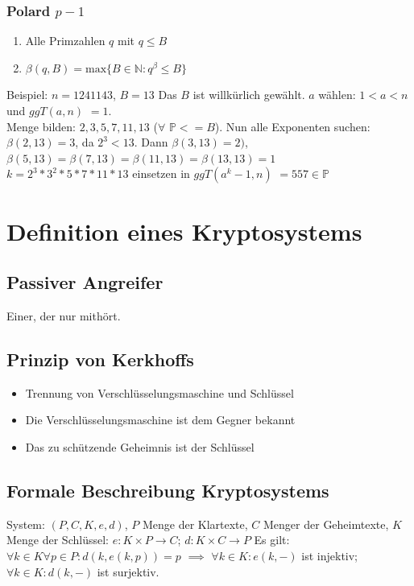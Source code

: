 \documentclass[10pt]{article}
\newcommand{\PN}{\mathbb{P}} %
\begin{document}
\subsubsection{Polard $p -1$}
\begin{enumerate}
\item Alle Primzahlen $q$ mit $q \le B$
\item $\beta(q, B) = \text{max}\{B \in \mathbb{N}: q^\beta \le B\}$
\end{enumerate}
Beispiel:
$n=1241143$, $B=13$ Das $B$ ist willkürlich gewählt. $a$ wählen: $ 1 < a < n$ und $ggT(a, n)$ $= 1$. \\
Menge bilden: ${2, 3, 5, 7, 11, 13}$ ($\forall$ $\PN<=B$). Nun alle Exponenten suchen: $\beta (2, 13) = 3$, da $2^3 < 13$. Dann $\beta (3, 13) = 2)$, 
$\beta (5, 13) = \beta (7, 13) = \beta (11, 13) = \beta (13, 13) = 1$ \\
$k = 2^3 * 3^2 * 5 * 7 * 11 * 13$ einsetzen in $ggT(a^k-1, n)$ $= 557 \in \PN$

\newpage
\section{Definition eines Kryptosystems}
\subsection{Passiver Angreifer}
Einer, der nur mithört.
\subsection{Prinzip von Kerkhoffs}
\begin{itemize}
	\item Trennung von Verschlüsselungsmaschine und Schlüssel
	\item Die Verschlüsselungsmaschine ist dem Gegner bekannt
	\item Das zu schützende Geheimnis ist der Schlüssel
\end{itemize}
\subsection{Formale Beschreibung Kryptosystems}
System: $(P, C, K, e, d)$, $P$ Menge der Klartexte, $C$ Menger der Geheimtexte, $K$ Menge der Schlüssel:
$e: K \times P \rightarrow C$; $d: K \times C \rightarrow P$
Es gilt: $\forall k \in K \forall p \in P: d (k, e (k, p)) = p$ $\implies$ $\forall k \in K : e(k, -)$ ist injektiv; $\forall k \in K: d(k, -)$ ist surjektiv.
\end{document}
